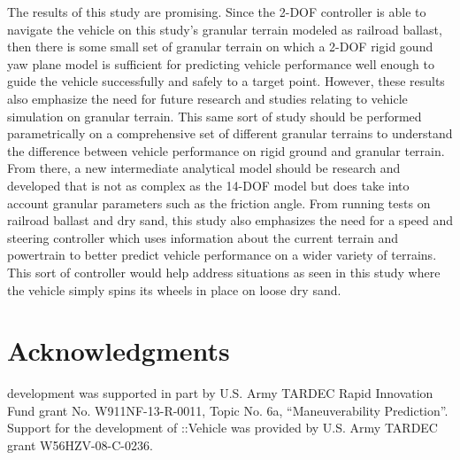 \documentclass[12pt,twocolumn]{article}
\newcommand{\CHRONO}{{\sffamily{{Chrono}}}}
\newcommand{\ChronoVehicle}{{\sffamily{Chrono}}::Vehicle}
\begin{document}
The results of this study are promising. Since the 2-DOF controller is able to navigate the {\CHRONO} vehicle on this study's granular terrain modeled as railroad ballast, then there is some small set of granular terrain on which a 2-DOF rigid gound yaw plane model is sufficient for predicting vehicle performance well enough to guide the vehicle successfully and safely to a target point. However, these results also emphasize the need for future research and studies relating to vehicle simulation on granular terrain. This same sort of study should be performed parametrically on a comprehensive set of different granular terrains to understand the difference between vehicle performance on rigid ground and granular terrain. From there, a new intermediate analytical model should be research and developed that is not as complex as the 14-DOF model but does take into account granular parameters such as the friction angle. From running tests on railroad ballast and dry sand, this study also emphasizes the need for a speed and steering controller which uses information about the current terrain and powertrain to better predict vehicle performance on a wider variety of terrains. This sort of controller would help address situations as seen in this study where the vehicle simply spins its wheels in place on loose dry sand. 




\section*{Acknowledgments}
{\CHRONO} development was supported in part by U.S. Army TARDEC Rapid Innovation Fund grant No. W911NF-13-R-0011, Topic No. 6a, ``Maneuverability Prediction''.
Support for the development of {\ChronoVehicle} was provided by U.S. Army TARDEC grant W56HZV-08-C-0236.





\end{document}
